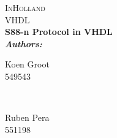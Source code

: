 \documentclass[12pt]{report}
\begin{document}
	\begin{titlepage}
		
		\pagecolor{landanimal}\afterpage{\nopagecolor}
		\center	
		
		\color{white}
		\textsc{\LARGE InHolland}\\[1.5cm] %
		\textsc{\Large VHDL}\\[2.5cm] %
		
		
		\huge \bfseries S88-n Protocol in VHDL \\[2.0cm] %
		
		\emph{Authors:}\\
		
		\begin{minipage}{0.4\textwidth}
			\begin{flushleft} \large
				
				Koen Groot \\ 549543
			\end{flushleft}
		\end{minipage}
		~
		\begin{minipage}{0.4\textwidth}
			\begin{flushright} \large
				\large Ruben Pera \\ 551198
			\end{flushright}
		\end{minipage}
	
	
		
	\end{titlepage}

	\tableofcontents
	\clearpage
	

	
	
	

	
	
	
	
		
\end{document}
